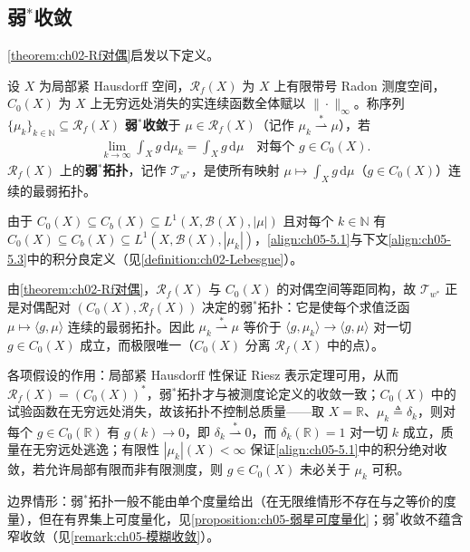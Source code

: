 \documentclass[../../main.tex]{subfiles}%
\begin{document}
\subsection{弱$^*$收敛}\label{subsection:ch05-弱星收敛}

\cref{theorem:ch02-Rf对偶}启发以下定义。

\begin{definition}\label{definition:ch05-弱星收敛}
设 $X$ 为局部紧 Hausdorff 空间，$\mathscr{R}_f(X)$ 为 $X$ 上有限带号 Radon 测度空间，$C_0(X)$ 为 $X$ 上无穷远处消失的实连续函数全体赋以 $\|\cdot\|_\infty$。称序列 $\{\mu_k\}_{k\in\mathbb{N}}\subseteq\mathscr{R}_f(X)$ \textbf{弱$^*$收敛}于 $\mu\in\mathscr{R}_f(X)$（记作 $\mu_k\stackrel{*}{\rightharpoonup}\mu$），若
\begin{align}
\lim_{k\to\infty}\int_X g\,\mathrm{d}\mu_k=\int_X g\,\mathrm{d}\mu
\quad\text{对每个 }g\in C_0(X).\label{align:ch05-5.1}
\end{align}
$\mathscr{R}_f(X)$ 上的\textbf{弱$^*$拓扑}，记作 $\mathcal{T}_{w^*}$，是使所有映射 $\mu\mapsto\int_X g\,\mathrm{d}\mu$（$g\in C_0(X)$）连续的最弱拓扑。
\end{definition}

\begin{remark}\label{remark:ch05-弱星积分}
由于 $C_0(X)\subseteq C_b(X)\subseteq L^1(X,\mathscr{B}(X),|\mu|)$ 且对每个 $k\in\mathbb{N}$ 有 $C_0(X)\subseteq C_b(X)\subseteq L^1(X,\mathscr{B}(X),|\mu_k|)$，\eqref{align:ch05-5.1}与下文\eqref{align:ch05-5.3}中的积分良定义（见\cref{definition:ch02-Lebesgue}）。
\end{remark}

\begin{remark}\label{remark:ch05-弱星动机}
由\cref{theorem:ch02-Rf对偶}，$\mathscr{R}_f(X)$ 与 $C_0(X)$ 的对偶空间等距同构，故 $\mathcal{T}_{w^*}$ 正是对偶配对 $(C_0(X),\mathscr{R}_f(X))$ 决定的弱$^*$拓扑：它是使每个求值泛函 $\mu\mapsto\langle g,\mu\rangle$ 连续的最弱拓扑。因此 $\mu_k\stackrel{*}{\rightharpoonup}\mu$ 等价于 $\langle g,\mu_k\rangle\to\langle g,\mu\rangle$ 对一切 $g\in C_0(X)$ 成立，而极限唯一（$C_0(X)$ 分离 $\mathscr{R}_f(X)$ 中的点）。

各项假设的作用：局部紧 Hausdorff 性保证 Riesz 表示定理可用，从而 $\mathscr{R}_f(X)=(C_0(X))^*$，弱$^*$拓扑才与被测度论定义的收敛一致；$C_0(X)$ 中的试验函数在无穷远处消失，故该拓扑不控制总质量——取 $X=\mathbb{R}$、$\mu_k\triangleq\delta_k$，则对每个 $g\in C_0(\mathbb{R})$ 有 $g(k)\to0$，即 $\delta_k\stackrel{*}{\rightharpoonup}0$，而 $\delta_k(\mathbb{R})=1$ 对一切 $k$ 成立，质量在无穷远处逃逸；有限性 $|\mu_k|(X)<\infty$ 保证\eqref{align:ch05-5.1}中的积分绝对收敛，若允许局部有限而非有限测度，则 $g\in C_0(X)$ 未必关于 $\mu_k$ 可积。

边界情形：弱$^*$拓扑一般不能由单个度量给出（在无限维情形不存在与之等价的度量），但在有界集上可度量化，见\cref{proposition:ch05-弱星可度量化}；弱$^*$收敛不蕴含窄收敛（见\cref{remark:ch05-模糊收敛}）。
\end{remark}
\end{document}
